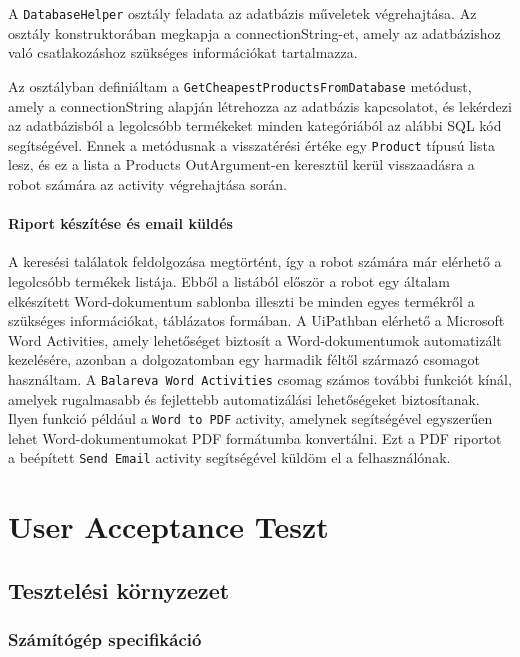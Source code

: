 \documentclass[
]{thesis-ekf}
\theoremstyle{definition}
\theoremstyle{remark}
\begin{document}
A \texttt{DatabaseHelper} osztály feladata az adatbázis műveletek végrehajtása. Az osztály konstruktorában megkapja a connectionString-et, amely az adatbázishoz való csatlakozáshoz szükséges információkat tartalmazza. 

Az osztályban definiáltam a \texttt{GetCheapestProductsFromDatabase} metódust, amely a connectionString alapján létrehozza az adatbázis kapcsolatot, és lekérdezi az adatbázisból a legolcsóbb termékeket minden kategóriából az alábbi SQL kód segítségével. Ennek a metódusnak a visszatérési értéke egy \texttt{Product} típusú lista lesz, és ez a lista a Products OutArgument-en keresztül kerül visszaadásra a robot számára az activity végrehajtása során.


\newpage
\subsubsection*{Riport készítése és email küldés}
A keresési találatok feldolgozása megtörtént, így a robot számára már elérhető a legolcsóbb termékek listája. Ebből a listából először a robot egy általam elkészített Word-dokumentum sablonba illeszti be minden egyes termékről a szükséges információkat, táblázatos formában. A UiPathban elérhető a Microsoft Word Activities, amely lehetőséget biztosít a Word-dokumentumok automatizált kezelésére, azonban a dolgozatomban egy harmadik féltől származó csomagot használtam. A \texttt{Balareva Word Activities} csomag számos további funkciót kínál, amelyek rugalmasabb és fejlettebb automatizálási lehetőségeket biztosítanak. Ilyen funkció például a \texttt{Word to PDF} activity, amelynek segítségével egyszerűen lehet Word-dokumentumokat PDF formátumba konvertálni. Ezt a PDF riportot a beépített \texttt{Send Email} activity segítségével küldöm el a felhasználónak.

\chapter{User Acceptance Teszt }
\section{Tesztelési környzezet}
\subsection{Számítógép specifikáció}
\end{document}
